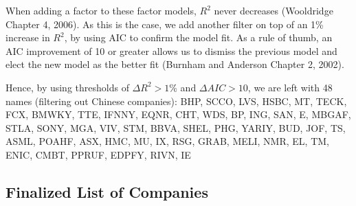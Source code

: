 \documentclass{article}
\begin{document}
When adding a factor to these factor models, $R^2$ never decreases
(Wooldridge Chapter 4, 2006). As this is the case, we add another filter
on top of an 1\% increase in $R^2$, by using AIC to confirm the model fit.
As a rule of thumb, an AIC improvement of 10 or greater allows us to
dismiss the previous model and elect the new model as the better fit
(Burnham and Anderson Chapter 2, 2002).

\begin{flushleft}
Hence, by using thresholds of $\Delta R^2 > 1\%$ and $\Delta AIC > 10$, we are left with 48 names (filtering out Chinese
companies): \textquotesingle BHP\textquotesingle,
\textquotesingle SCCO\textquotesingle,
\textquotesingle LVS\textquotesingle,
\textquotesingle HSBC\textquotesingle,
\textquotesingle MT\textquotesingle,
\textquotesingle TECK\textquotesingle,
\textquotesingle FCX\textquotesingle,
\textquotesingle BMWKY\textquotesingle,
\textquotesingle TTE\textquotesingle,
\textquotesingle IFNNY\textquotesingle,
\textquotesingle EQNR\textquotesingle,
\textquotesingle CHT\textquotesingle,
\textquotesingle WDS\textquotesingle,
\textquotesingle BP\textquotesingle,
\textquotesingle ING\textquotesingle,
\textquotesingle SAN\textquotesingle,
\textquotesingle E\textquotesingle,
\textquotesingle MBGAF\textquotesingle,
\textquotesingle STLA\textquotesingle,
\textquotesingle SONY\textquotesingle,
\textquotesingle MGA\textquotesingle,
\textquotesingle VIV\textquotesingle,
\textquotesingle STM\textquotesingle,
\textquotesingle BBVA\textquotesingle,
\textquotesingle SHEL\textquotesingle,
\textquotesingle PHG\textquotesingle,
\textquotesingle YARIY\textquotesingle,
\textquotesingle BUD\textquotesingle,
\textquotesingle JOF\textquotesingle,
\textquotesingle TS\textquotesingle,
\textquotesingle ASML\textquotesingle,
\textquotesingle POAHF\textquotesingle,
\textquotesingle ASX\textquotesingle,
\textquotesingle HMC\textquotesingle,
\textquotesingle MU\textquotesingle,
\textquotesingle IX\textquotesingle,
\textquotesingle RSG\textquotesingle,
\textquotesingle GRAB\textquotesingle,
\textquotesingle MELI\textquotesingle,
\textquotesingle NMR\textquotesingle,
\textquotesingle EL\textquotesingle,
\textquotesingle TM\textquotesingle,
\textquotesingle ENIC\textquotesingle,
\textquotesingle CMBT\textquotesingle,
\textquotesingle PPRUF\textquotesingle,
\textquotesingle EDPFY\textquotesingle,
\textquotesingle RIVN\textquotesingle,
\textquotesingle IE\textquotesingle{}
\end{flushleft}

\subsection{Finalized List of Companies}
\end{document}
